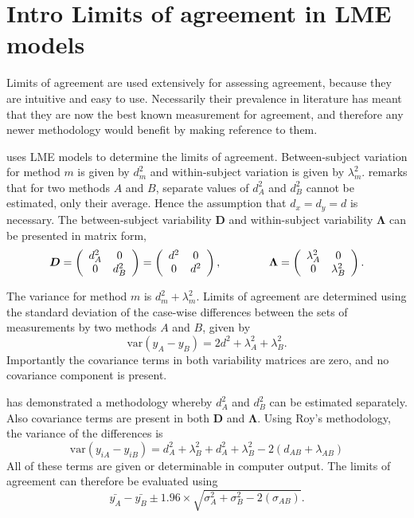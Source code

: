 \documentclass[12pt, a4paper]{report}
\theoremstyle{plain}
\theoremstyle{definition}
\theoremstyle{remark}
\begin{document}
\section{Intro Limits of agreement in LME models}

Limits of agreement are used extensively for assessing agreement, because they are intuitive and easy to use.
Necessarily their prevalence in literature has meant that they are now the best known measurement for agreement, and therefore any newer methodology would benefit by making reference to them.

\citet{BXC2008} uses LME models to determine the limits of agreement. Between-subject variation for method $m$ is given by $d^2_{m}$ and within-subject variation is given by $\lambda^2_{m}$.  \citet{BXC2008} remarks that for two methods $A$ and $B$, separate values of $d^2_{A}$ and $d^2_{B}$ cannot be estimated, only their average. Hence the assumption that $d_{x}= d_{y}= d$ is necessary. The between-subject variability $\boldsymbol{D}$ and within-subject variability $\boldsymbol{\Lambda}$ can be presented in matrix form,\[
\boldsymbol{D} = \left(%
\begin{array}{cc}
d^2_{A}& 0 \\
0 & d^2_{B} \\
\end{array}%
\right)=\left(%
\begin{array}{cc}
d^2& 0 \\
0 & d^2\\
\end{array}%
\right),
\hspace{1.5cm}
\boldsymbol{\Lambda} = \left(%
\begin{array}{cc}
\lambda^2_{A}& 0 \\
0 & \lambda^2_{B} \\
\end{array}%
\right).
\]

The variance for method $m$ is $d^2_{m}+\lambda^2_{m}$. Limits of agreement are determined using the standard deviation of the case-wise differences between the sets of measurements by two methods $A$ and $B$, given by
\begin{equation}
\mbox{var} (y_{A}-y_{B}) = 2d^2 + \lambda^2_{A}+ \lambda^2_{B}.
\end{equation}
Importantly the covariance terms in both variability matrices are zero, and no covariance component is present.


\citet{roy} has demonstrated a methodology whereby $d^2_{A}$ and $d^2_{B}$ can be estimated separately. Also covariance terms are present in both $\boldsymbol{D}$ and $\boldsymbol{\Lambda}$. Using Roy's methodology, the variance of the differences is
\begin{equation}
\mbox{var} (y_{iA}-y_{iB})= d^2_{A} + \lambda^2_{B} + d^2_{A} + \lambda^2_{B} - 2(d_{AB} + \lambda_{AB})
\end{equation}
All of these terms are given or determinable in computer output.
The limits of agreement can therefore be evaluated using
\begin{equation}
\bar{y_{A}}-\bar{y_{B}} \pm 1.96 \times \sqrt{ \sigma^2_{A} + \sigma^2_{B}  - 2(\sigma_{AB})}.
\end{equation}
\end{document}

